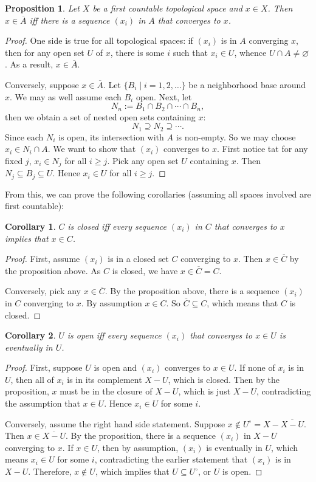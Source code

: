 \documentclass[12pt]{article}
\newtheorem{prop}{Proposition}
\newtheorem{cor}{Corollary}
\begin{document}
\begin{prop} Let $X$ be a first countable topological space and $x\in X$.  Then $x\in \overline{A}$ iff there is a sequence $(x_i)$ in $A$ that converges to $x$. \end{prop}
\begin{proof}  One side is true for all topological spaces: if $(x_i)$ is in $A$ converging $x$, then for any open set $U$ of $x$, there is some $i$ such that $x_i\in U$, whence $U\cap A\ne \varnothing$.  As a result, $x\in \overline{A}$.

Conversely, suppose $x\in \overline{A}$.  Let $\lbrace B_i\mid i=1,2,\ldots\rbrace$ be a neighborhood base around $x$.  We may as well assume each $B_i$ open.  Next, let $$N_n:=B_1\cap B_2\cap \cdots \cap B_n,$$ then we obtain a set of nested open sets containing $x$: $$N_1\supseteq N_2 \supseteq \cdots.$$  Since each $N_i$ is open, its intersection with $A$ is non-empty.  So we may choose $x_i\in N_i\cap A$.  We want to show that $(x_i)$ converges to $x$.  First notice tat for any fixed $j$, $x_i\in N_j$ for all $i\ge j$.  Pick any open set $U$ containing $x$.  Then $N_j\subseteq B_j\subseteq U$.  Hence $x_i\in U$ for all $i\ge j$.
\end{proof}

From this, we can prove the following corollaries (assuming all spaces involved are first countable):
\begin{cor} $C$ is closed iff every sequence $(x_i)$ in $C$ that converges to $x$ implies that $x\in C$. \end{cor}
\begin{proof}  First, assume $(x_i)$ is in a closed set $C$ converging to $x$.  Then $x\in \overline{C}$ by the proposition above.  As $C$ is closed, we have $x\in \overline{C}=C$.  

Conversely, pick any $x\in \overline{C}$.  By the proposition above, there is a sequence $(x_i)$ in $C$ converging to $x$.  By assumption $x\in C$.  So $\overline{C}\subseteq C$, which means that $C$ is closed.
\end{proof}

\begin{cor} $U$ is open iff every sequence $(x_i)$ that converges to $x \in U$ is eventually in $U$.  \end{cor}
\begin{proof}  First, suppose $U$ is open and $(x_i)$ converges to $x\in U$.  If  none of $x_i$ is in $U$, then all of $x_i$ is in its complement $X-U$, which is closed.  Then by the proposition, $x$ must be in the closure of $X-U$, which is just $X-U$, contradicting the assumption that $x\in U$.  Hence $x_i\in U$ for some $i$.

Conversely, assume the right hand side statement.  Suppose $x\notin U^{\circ}=X-\overline{X-U}$.  Then $x\in \overline{X-U}$.  By the proposition, there is a sequence $(x_i)$ in $X-U$ converging to $x$.  If $x\in U$, then by assumption, $(x_i)$ is eventually in $U$, which means $x_i\in U$ for some $i$, contradicting the earlier statement that $(x_i)$ is in $X-U$.  Therefore, $x\notin U$, which implies that $U\subseteq U^{\circ}$, or $U$ is open.
\end{proof}
\end{document}
